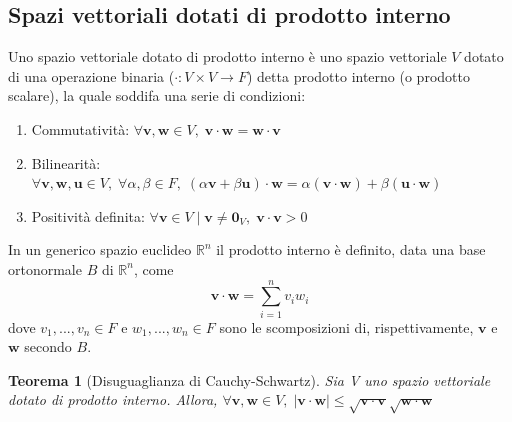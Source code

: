\documentclass{article}
\newtheorem{theorem}{Teorema}
\begin{document}
\subsection{Spazi vettoriali dotati di prodotto interno} \label{subsec:vsdotted}
    Uno spazio vettoriale dotato di prodotto interno è uno spazio vettoriale $V$ dotato di una operazione binaria ($\cdot : V \times V \rightarrow F$) detta prodotto interno (o prodotto scalare), la quale soddifa una serie di condizioni:
    \begin{enumerate}[label=(\arabic*)]
        \item Commutatività: $\forall \mathbf{v}, \mathbf{w} \in V, \; \mathbf{v} \cdot \mathbf{w} = \mathbf{w} \cdot \mathbf{v}$
        \item Bilinearità: $\forall \mathbf{v}, \mathbf{w}, \mathbf{u} \in V, \; \forall \alpha, \beta \in F, \; (\alpha \mathbf{v} + \beta \mathbf{u}) \cdot \mathbf{w} = \alpha (\mathbf{v} \cdot \mathbf{w}) + \beta (\mathbf{u} \cdot \mathbf{w})$
        \item Positività definita: $\forall \mathbf{v} \in V \; | \; \mathbf{v} \neq \mathbf{0}_V, \; \mathbf{v} \cdot \mathbf{v} > 0$
    \end{enumerate}

    In un generico spazio euclideo $\mathbb{R}^{n}$ il prodotto interno è definito, data una base ortonormale $B$ di $\mathbb{R}^{n}$, come
    \[
        \mathbf{v} \cdot \mathbf{w} = \displaystyle \sum_{i = 1}^{n} v_i w_i
    \]
    dove $v_1,...,v_n \in F$ e $w_1,...,w_n \in F$ sono le scomposizioni di, rispettivamente, $\mathbf{v}$ e $\mathbf{w}$ secondo $B$. 

    \vspace{10pt}
    \begin{theorem}[Disuguaglianza di Cauchy-Schwartz]
        Sia V uno spazio vettoriale dotato di prodotto interno. Allora, $\forall \mathbf{v}, \mathbf{w} \in V, \; |\mathbf{v} \cdot \mathbf{w}| \leq \sqrt{\mathbf{v} \cdot \mathbf{v}}\sqrt{\mathbf{w} \cdot \mathbf{w}}$ 
    \end{theorem}
\end{document}
